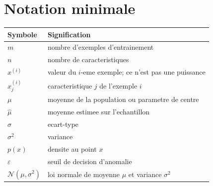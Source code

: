 \chapter{Notation minimale}

\begin{tabularx}{\textwidth}{@{}lX@{}}
\toprule
Symbole & Signification \\
\midrule
$m$ & nombre d'exemples d'entrainement \\
$n$ & nombre de caracteristiques \\
$x^{(i)}$ & valeur du $i$-eme exemple; ce n'est pas une puissance \\
$x_j^{(i)}$ & caracteristique $j$ de l'exemple $i$ \\
$\mu$ & moyenne de la population ou parametre de centre \\
$\widehat\mu$ & moyenne estimee sur l'echantillon \\
$\sigma$ & ecart-type \\
$\sigma^2$ & variance \\
$p(x)$ & densite au point $x$ \\
$\varepsilon$ & seuil de decision d'anomalie \\
$\mathcal N(\mu,\sigma^2)$ & loi normale de moyenne $\mu$ et variance $\sigma^2$ \\
\bottomrule
\end{tabularx}

